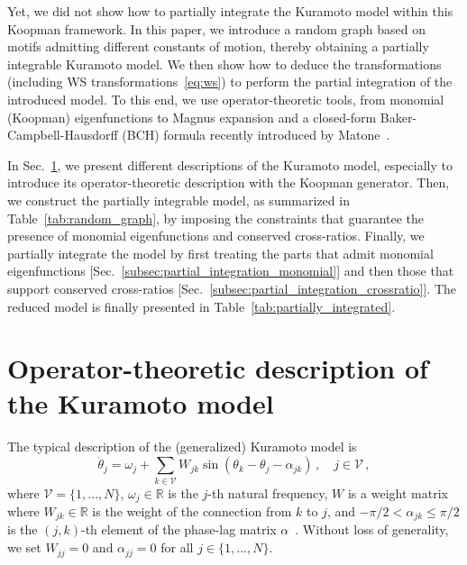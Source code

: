 \documentclass[aps,pre,reprint,longbibliography,superscriptaddress,noshowpacs,floatfix]{revtex4-2}
\theoremstyle{definition}
\theoremstyle{remark}
\begin{document}
Yet, we did not show how to partially integrate the Kuramoto model within this Koopman framework. In this paper, we introduce a random graph based on motifs admitting different constants of motion, thereby obtaining a partially integrable Kuramoto model. We then show how to deduce the transformations (including WS transformations~\eqref{eq:ws}) to perform the partial integration of the introduced model. To this end, we use operator-theoretic tools, from monomial (Koopman) eigenfunctions to Magnus expansion and a closed-form Baker-Campbell-Hausdorff (BCH) formula recently introduced by Matone~\cite{Matone2015}. 

In Sec.~\ref{sec:different_descriptions}, we present different descriptions of the Kuramoto model, especially to introduce its operator-theoretic description with the Koopman generator. Then, we construct the partially integrable model, as summarized in Table~\ref{tab:random_graph}, by imposing the constraints that guarantee the presence of monomial eigenfunctions and conserved cross-ratios. Finally, we partially integrate the model by first treating the parts that admit monomial eigenfunctions [Sec.~\ref{subsec:partial_integration_monomial}] and then those that support conserved cross-ratios [Sec.~\ref{subsec:partial_integration_crossratio}]. The reduced model is finally presented in Table~\ref{tab:partially_integrated}. 


\section{Operator-theoretic description of the Kuramoto model}
\label{sec:different_descriptions}

The typical description of the (generalized) Kuramoto model is 
\begin{equation}\label{eq:kuramoto}
    \dot{\theta}_j = \omega_j + \sum_{k \in\mathcal{V}} W_{jk} \sin(\theta_k - \theta_j - \alpha_{jk})\,,\quad j\in\mathcal{V}\,,
\end{equation}
where $\mathcal{V} = \{1,...,N\}$, $\omega_j\in\mathbb{R}$ is the $j$-th natural frequency, $W$ is a weight matrix where $W_{jk}\in\mathbb{R}$ is the weight of the connection from $k$ to $j$, and $-\pi/2 < \alpha_{jk}\leq \pi/2$ is the $(j,k)$-th element of the phase-lag matrix $\alpha$~\cite{Kuramoto1975, Sakaguchi1986, Rodrigues2016}. Without loss of generality, we set $W_{jj} = 0$ and $\alpha_{jj} = 0$ for all $j\in\{1,...,N\}$.
\end{document}
